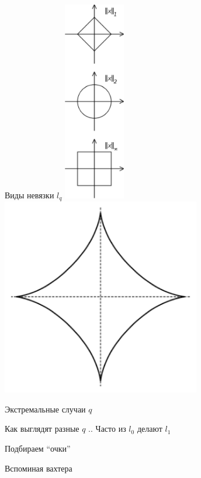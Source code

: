 \documentclass[14pt, fleqn, xcolor={dvipsnames, table}]{beamer}
\begin{document}
\begin{frame}{Виды невязки $l_q$}
\centering
\includegraphics[width=0.2\textwidth]{lq1.png}\includegraphics[width=0.65\textwidth]{lq2.png}
\end{frame}

\begin{frame}{Экстремальные случаи $q$}
\end{frame}

\begin{frame}{Как выглядят разные $q$}
..
Часто из $l_0$ делают $l_1$
\end{frame}

\begin{frame}{Подбираем ``очки''} %
\end{frame}

\begin{frame}{Вспоминая вахтера}
\end{frame}
\end{document}
